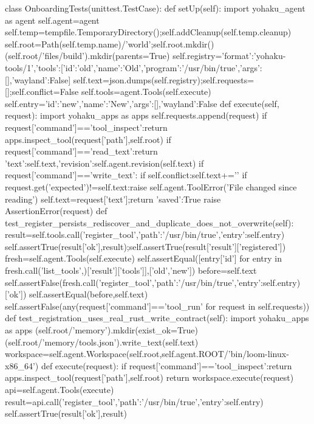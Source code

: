 class OnboardingTests(unittest.TestCase):
    def setUp(self):
        import yohaku_agent as agent
        self.agent=agent
        self.temp=tempfile.TemporaryDirectory();self.addCleanup(self.temp.cleanup)
        self.root=Path(self.temp.name)/'world';self.root.mkdir()
        (self.root/'files/build').mkdir(parents=True)
        self.registry={'format':'yohaku-tools/1','tools':[{'id':'old','name':'Old','program':'/usr/bin/true','args':[],'wayland':False}]}
        self.text=json.dumps(self.registry);self.requests=[];self.conflict=False
        self.tools=agent.Tools(self.execute)
        self.entry={'id':'new','name':'New','args':[],'wayland':False}
    def execute(self, request):
        import yohaku_apps as apps
        self.requests.append(request)
        if request['command']=='tool_inspect':return apps.inspect_tool(request['path'],self.root)
        if request['command']=='read_text':return {'text':self.text,'revision':self.agent.revision(self.text)}
        if request['command']=='write_text':
            if self.conflict:self.text+='\n'
            if request.get('expected')!=self.text:raise self.agent.ToolError('File changed since reading')
            self.text=request['text'];return {'saved':True}
        raise AssertionError(request)
    def test_register_persists_rediscover_and_duplicate_does_not_overwrite(self):
        result=self.tools.call('register_tool',{'path':'/usr/bin/true','entry':self.entry})
        self.assertTrue(result['ok'],result);self.assertTrue(result['result']['registered'])
        fresh=self.agent.Tools(self.execute)
        self.assertEqual([entry['id'] for entry in fresh.call('list_tools',{})['result']['tools']],['old','new'])
        before=self.text
        self.assertFalse(fresh.call('register_tool',{'path':'/usr/bin/true','entry':self.entry})['ok'])
        self.assertEqual(before,self.text)
        self.assertFalse(any(request['command']=='tool_run' for request in self.requests))
    def test_registration_uses_real_rust_write_contract(self):
        import yohaku_apps as apps
        (self.root/'memory').mkdir(exist_ok=True)
        (self.root/'memory/tools.json').write_text(self.text)
        workspace=self.agent.Workspace(self.root,self.agent.ROOT/'bin/loom-linux-x86_64')
        def execute(request):
            if request['command']=='tool_inspect':return apps.inspect_tool(request['path'],self.root)
            return workspace.execute(request)
        api=self.agent.Tools(execute)
        result=api.call('register_tool',{'path':'/usr/bin/true','entry':self.entry})
        self.assertTrue(result['ok'],result)
